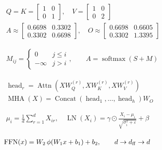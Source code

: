 \documentclass[border=4pt,multi=preview]{standalone}
\begin{document}
\begin{preview}\color{ink}\fontsize{24}{30}\selectfont
$\displaystyle \begin{gathered}Q=K=\begin{bmatrix}1&0\\0&1\end{bmatrix},\quad V=\begin{bmatrix}1&0\\0&2\end{bmatrix}\\A\approx\begin{bmatrix}0.6698&0.3302\\0.3302&0.6698\end{bmatrix},\quad O\approx\begin{bmatrix}0.6698&0.6605\\0.3302&1.3395\end{bmatrix}\end{gathered}$
\end{preview}
\begin{preview}\color{ink}\fontsize{24}{30}\selectfont
$\displaystyle \begin{gathered}M_{ij}=\begin{cases}0&j\le i\\-\infty&j>i\end{cases},\qquad A=\operatorname{softmax}(S+M)\end{gathered}$
\end{preview}
\begin{preview}\color{ink}\fontsize{24}{30}\selectfont
$\displaystyle \begin{gathered}\operatorname{head}_r=\operatorname{Attn}(XW_Q^{(r)},XW_K^{(r)},XW_V^{(r)})\\\operatorname{MHA}(X)=\operatorname{Concat}(\operatorname{head}_1,\ldots,\operatorname{head}_h)W_O\end{gathered}$
\end{preview}
\begin{preview}\color{ink}\fontsize{24}{30}\selectfont
$\displaystyle \begin{gathered}\mu_i=\frac1d\sum_{r=1}^{d}X_{ir},\quad\operatorname{LN}(X_i)=\gamma\odot\frac{X_i-\mu_i}{\sqrt{\sigma_i^2+\varepsilon}}+\beta\end{gathered}$
\end{preview}
\begin{preview}\color{ink}\fontsize{24}{30}\selectfont
$\displaystyle \begin{gathered}\operatorname{FFN}(x)=W_2\,\phi(W_1x+b_1)+b_2,\qquad d\rightarrow d_{\rm ff}\rightarrow d\end{gathered}$
\end{preview}
\end{document}
